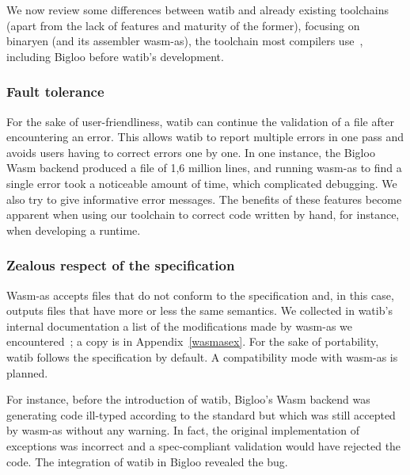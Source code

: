 \documentclass[a4paper,11pt]{article}
\begin{document}
We now review some differences between \textsf{watib} and already existing
toolchains (apart from the lack of features and maturity of the former),
focusing on binaryen (and its assembler \textsf{wasm-as}), the toolchain most
compilers use~\cite{Binaryen}, including Bigloo before \textsf{watib}'s
development.
\subsubsection{Fault tolerance}
For the sake of user-friendliness, \textsf{watib} can continue the validation of
a file after encountering an error. This allows \textsf{watib} to report
multiple errors in one pass and avoids users having to correct errors one by
one. In one instance, the Bigloo Wasm backend produced a file of 1,6 million
lines, and running \textsf{wasm-as} to find a single error took a noticeable
amount of time, which complicated debugging. We also try to give informative
error messages. The benefits of these features become apparent when using our
toolchain to correct code written by hand, for instance, when developing a
runtime.

\subsubsection{{Zealous\protect\footnotemark} respect of the specification}
\textsf{Wasm-as} accepts files that do not conform to the specification and, in
this case, outputs files that have more or less the same semantics. We collected
in \textsf{watib}'s internal documentation a list of the modifications made by
\textsf{wasm-as} we encountered~\cite{WasmAsExtension}; a copy is in
Appendix~\ref{wasmasex}. For the sake of portability, \textsf{watib} follows the
specification by default. A compatibility mode with \textsf{wasm-as} is
planned.

For instance, before the introduction of \textsf{watib}, Bigloo's Wasm backend
was generating code ill-typed according to the standard but which was still
accepted by \textsf{wasm-as} without any warning. In fact, the original
implementation of exceptions was incorrect and a spec-compliant validation would
have rejected the code. The integration of \textsf{watib} in Bigloo revealed the
bug.
\end{document}

